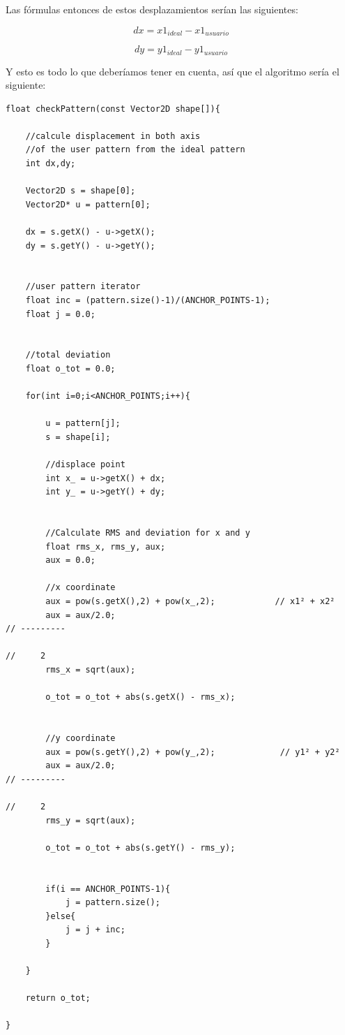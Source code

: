 \vspace{0.5cm}

Las fórmulas entonces de estos desplazamientos serían las siguientes:

\vspace{0.5cm}

\begin{equation}
dx =x1_{ideal} - x1_{usuario}
\end{equation}

\vspace{0.5cm}

\begin{equation}
dy =y1_{ideal} - y1_{usuario}
\end{equation}

\vspace{0.5cm}

Y esto es todo lo que deberíamos tener en cuenta, así que el algoritmo sería el siguiente:

\vspace{0.5cm}

\begin{lstlisting}[caption={Algoritmo de reconocimiento de gestos}, label={code:checkpattern}]
float checkPattern(const Vector2D shape[]){

	//calcule displacement in both axis
	//of the user pattern from the ideal pattern
	int dx,dy;

	Vector2D s = shape[0];
	Vector2D* u = pattern[0];

	dx = s.getX() - u->getX();
	dy = s.getY() - u->getY();


	//user pattern iterator
	float inc = (pattern.size()-1)/(ANCHOR_POINTS-1);
	float j = 0.0;


	//total deviation 
	float o_tot = 0.0;

	for(int i=0;i<ANCHOR_POINTS;i++){

		u = pattern[j];
		s = shape[i];

		//displace point
		int x_ = u->getX() + dx;
		int y_ = u->getY() + dy;


		//Calculate RMS and deviation for x and y
		float rms_x, rms_y, aux;
		aux = 0.0;

		//x coordinate
		aux = pow(s.getX(),2) + pow(x_,2);            // x1² + x2²
		aux = aux/2.0;								                      // ---------
                                                                                        //     2
		rms_x = sqrt(aux);

		o_tot = o_tot + abs(s.getX() - rms_x);
		

		//y coordinate
		aux = pow(s.getY(),2) + pow(y_,2);             // y1² + y2²
		aux = aux/2.0;								                        // ---------
                                                                                          //     2   
		rms_y = sqrt(aux);

		o_tot = o_tot + abs(s.getY() - rms_y);


		if(i == ANCHOR_POINTS-1){
			j = pattern.size();
		}else{
			j = j + inc;
		}

	}

	return o_tot;

}
\end{lstlisting}

